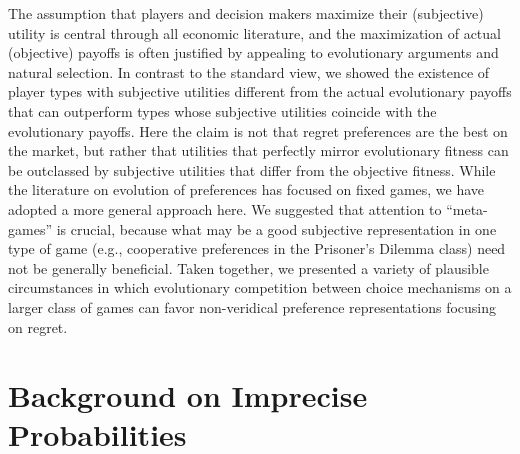 \documentclass[fleqn,reqno,12pt]{article}
\theoremstyle{Satz}
\theoremstyle{Bsp}
\begin{document}
The assumption that players and decision makers maximize their (subjective) utility is
central through all economic literature, and the maximization of actual (objective) payoffs is
often justified by appealing to evolutionary arguments and natural selection. In contrast to
the standard view, we showed the existence of player types with subjective utilities different
from the actual evolutionary payoffs that can outperform types whose subjective utilities
coincide with the evolutionary payoffs. Here the claim is not that regret preferences are the best on the market, but rather that utilities that perfectly mirror evolutionary fitness can be outclassed by subjective utilities that differ from the objective fitness.  While the literature on evolution of preferences has
focused on fixed games, we have adopted a more general approach here. We suggested that
attention to “meta-games” is crucial, because what may be a good subjective representation in
one type of game (e.g., cooperative preferences in the Prisoner’s Dilemma class) need not be
generally beneficial. Taken together, we presented a variety of plausible circumstances in
which evolutionary competition between choice mechanisms on a larger class of games can favor
non-veridical preference representations focusing on regret.



\appendix

\iffalse
\section{Background on Imprecise Probabilities}
\label{sec:impr-prob-beli}
\end{document}
